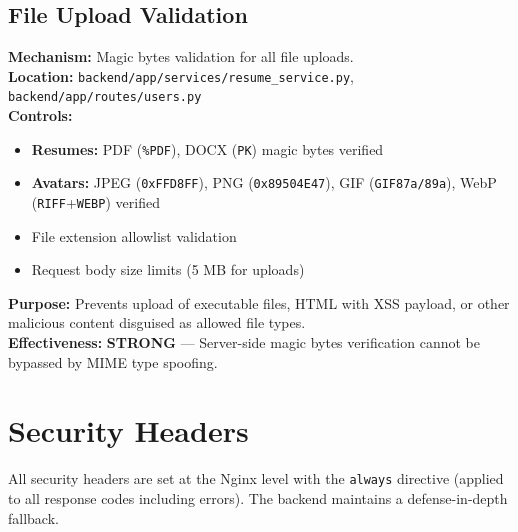 \documentclass[11pt,a4paper]{article}
\begin{document}
\subsection{File Upload Validation}

\begin{tcolorbox}[colback=shieldgreen!5, colframe=shieldgreen]
\textbf{Mechanism:} Magic bytes validation for all file uploads.\\
\textbf{Location:} \texttt{backend/app/services/resume\_service.py}, \texttt{backend/app/routes/users.py}\\
\textbf{Controls:}
\begin{itemize}[nosep]
  \item \textbf{Resumes:} PDF (\texttt{\%PDF}), DOCX (\texttt{PK}) magic bytes verified
  \item \textbf{Avatars:} JPEG (\texttt{0xFFD8FF}), PNG (\texttt{0x89504E47}), GIF (\texttt{GIF87a/89a}), WebP (\texttt{RIFF}+\texttt{WEBP}) verified
  \item File extension allowlist validation
  \item Request body size limits (5 MB for uploads)
\end{itemize}
\textbf{Purpose:} Prevents upload of executable files, HTML with XSS payload, or other malicious content disguised as allowed file types.\\
\textbf{Effectiveness:} \textcolor{shieldgreen}{\textbf{STRONG}} — Server-side magic bytes verification cannot be bypassed by MIME type spoofing.
\end{tcolorbox}

\section{Security Headers}

All security headers are set at the Nginx level with the \texttt{always} directive (applied to all response codes including errors). The backend maintains a defense-in-depth fallback.
\end{document}
